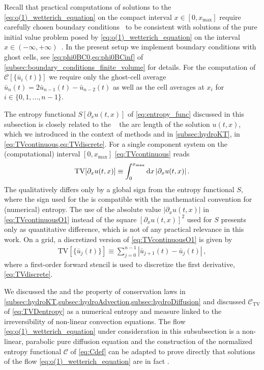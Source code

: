 Recall that practical computations of solutions to the \pde{} \eqref{eq:o(1)_wetterich_equation} on the compact interval $x \in [ 0, x_\mathrm{max} ]$ require carefully chosen boundary conditions~\cite{Koenigstein:2021syz,Steil:2021cbu} to be consistent with solutions of the pure initial value problem posed by \cref{eq:o(1)_wetterich_equation} on the interval $x \in ( - \infty, + \infty )$~\cite{Borchardt:2015rxa,Borchardt:2016pif}.
In the present \fv{} setup we implement boundary conditions with ghost cells, see \cref{eq:phi0BC0,eq:phi0BCinf} of \cref{subsec:boundary_conditions_finite_volume} for details.
For the computation of $\mathcal{C} [ \{ \bar{u}_i ( t ) \} ]$ we require only the ghost-cell average $\bar{u}_{n} ( t ) = 2 \bar{u}_{n-1} ( t ) - \bar{u}_{n-2} ( t )$ as well as the cell averages at $x_i$ for $i \in \{ 0, 1, \ldots, n - 1 \}$. \bigskip

The entropy functional $S [ \partial_x u ( t, x ) ]$ of \cref{eq:entropy_func} discussed in this subsection is closely related to the ~\cite{HARTEN1983357} \dash{} the arc length \dash{} of the solution $u ( t, x )$, which we introduced in the context of \fv{} methods and \cfd{} in \cref{subsec:hydroKT}, \viz{} in \cref{eq:TVcontinuous,eq:TVdiscrete}.
For a single component system on the (computational) interval $[ 0, x_\mathrm{max} ]$ \cref{eq:TVcontinuous} reads
\begin{align}
	\mathrm{TV} [ \partial_x u ( t, x ) ] \equiv \int_0^{x_\mathrm{max}} \dif x \, | \partial_x u ( t, x ) | \, .	\label{eq:TVcontinuousO1}
\end{align}
The \tv{} qualitatively differs only by a global sign from the entropy functional $S$, where the sign used for the \tv{} is compatible with the mathematical convention for (numerical) entropy.
The use of the absolute value $| \partial_x u ( t, x ) |$ in \cref{eq:TVcontinuousO1} instead of the square $[ \partial_x u ( t, x ) ]^2$ used for $S$ presents only as quantitative difference, which is not of any practical relevance in this work.
On a \fv{} grid, a discretized version of \cref{eq:TVcontinuousO1} is given by
\begin{align}
	\mathrm{TV} [ \{ \bar{u}_j ( t ) \} ] \equiv \sum_{j = 0}^{n-1} | \bar{u}_{j+1} ( t ) - \bar{u}_{j} ( t ) | \, ,	\label{eq:TVdiscreteO1}
\end{align}
where a first-order forward \fd{} stencil is used to discretize the first derivative, \cf{} \cref{eq:TVdiscrete}.

We discussed the \tv{} and the \tvni{} property of conservation laws in \cref{subsec:hydroKT,subsec:hydroAdvection,subsec:hydroDiffusion} and discussed $\mathcal{C}_\mathrm{TV}$ of \cref{eq:TVDentropy} as a numerical entropy and measure linked to the irreversibility of non-linear convection equations.
The flow \cref{eq:o(1)_wetterich_equation} under consideration in this subsubsection is a non-linear, parabolic pure diffusion equation and the construction of the normalized entropy functional $\mathcal{C}$ of \cref{eq:Cdef} can be adapted to prove directly that solutions of the flow \cref{eq:o(1)_wetterich_equation} are in fact \tvni{}.

